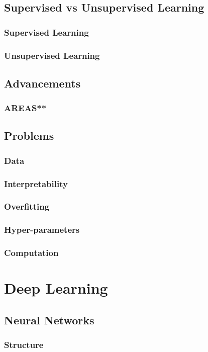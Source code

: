 \documentclass{book}
\begin{document}
  \section{Supervised vs Unsupervised Learning}
    \subsection{Supervised Learning}
    \subsection{Unsupervised Learning}
  \section{Advancements}
    \subsection{AREAS**}
  \section{Problems}
    \subsection{Data}
    \subsection{Interpretability}
    \subsection{Overfitting}
    \subsection{Hyper-parameters}
    \subsection{Computation}

\chapter{Deep Learning}
  \section{Neural Networks}
    \subsection{Structure}
\end{document}
